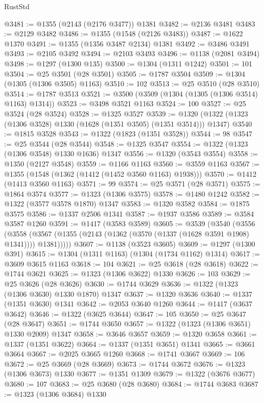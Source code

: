 \begin{lexlean}{RustStd}
\begin{coremodule}
{\begin{coremodule}
{{{{{{{{{{{{{{{{{{{{{{{{{{{{{{{{{{@3481 := @1355 (@2143 (@2176 @3477)) @1381
@3482 := @2136 @3481
@3483 := @2129 @3482
@3486 := @1355 (@1548 (@2126 @3483))
@3487 := @1622 @1370
@3491 := @1355 (@1356 @3487 @2134) @1381
@3492 := @3486 @3491
@3493 := @2105 @3492
@3494 := @2103 @3493
@3496 := @1138 (@2081 @3494)
@3498 := @1297 (@1300 @135)
@3500 := @1304 (@1311 @1242)
@3501 := 101
@3504 := @25 @3501 (@28 @3501)
@3505 := @1787 @3504
@3509 := @1304 (@1305 (@1306 @3505) @1163)
@3510 := 102
@3513 := @25 @3510 (@28 @3510)
@3514 := @1787 @3513
@3521 := @3500 (@3509 (@1304 (@1305 (@1306 @3514) @1163) @1314))
@3523 := @3498 @3521 @1163
@3524 := 100
@3527 := @25 @3524 (@28 @3524)
@3528 := @1325 @3527
@3539 := @1320 (@1322 (@1323 (@1306 @3528) @1330 (@1628 (@1351 @3505) (@1351 @3514))) @1347)
@3540 := @1815 @3528
@3543 := @1322 (@1823 (@1351 @3528))
@3544 := 98
@3547 := @25 @3544 (@28 @3544)
@3548 := @1325 @3547
@3554 := @1322 (@1323 (@1306 @3548) @1330 @1636) @1347
@3556 := @1320 (@3543 @3554)
@3558 := @1350 (@2127 @3548)
@3559 := @1166 @1163
@3560 := @3559 @1163
@3567 := @1355 (@1548 (@1362 (@1412 (@1452 @3560 @1163) @1938)))
@3570 := @1412 (@1413 @3560 @1163)
@3571 := 99
@3574 := @25 @3571 (@28 @3571)
@3575 := @1864 @3574
@3577 := @1323 (@1306 @3575)
@3578 := @1480 @1242
@3582 := @1322 (@3577 @3578 @1870) @1347
@3583 := @1320 @3582
@3584 := @1875 @3575
@3586 := @1337 @2506 @1341
@3587 := @1937 @3586
@3589 := @3584 @3587 @1260
@3591 := @1417 (@3583 @3589)
@3605 := @3539
    (@3540
      (@3556
        (@3558 (@3567 (@1355 (@2143 (@1362 (@3570 (@1337 (@1628 @3591 @1908) @1341)))) @1381)))))
@3607 := @1138 (@3523 @3605)
@3609 := @1297 (@1300 @391)
@3615 := @1304 (@1311 @1163) (@1304 (@1734 @1162) @1314)
@3617 := @3609 @3615 @1163
@3618 := 104
@3621 := @25 @3618 (@28 @3618)
@3622 := @1744 @3621
@3625 := @1323 (@1306 @3622) @1330
@3626 := 103
@3629 := @25 @3626 (@28 @3626)
@3630 := @1744 @3629
@3636 := @1322 (@1323 (@1306 @3630) @1330 @1870) @1347
@3637 := @1320 @3636
@3640 := @1337 (@1351 @3630) @1341
@3642 := @2053 @3640 @1260
@3644 := @1417 (@3637 @3642)
@3646 := @1322 (@3625 @3644)
@3647 := 105
@3650 := @25 @3647 (@28 @3647)
@3651 := @1744 @3650
@3657 := @1322 (@1323 (@1306 @3651) @1330 @2009) @1347
@3658 := @3646 @3657
@3659 := @1320 @3658
@3661 := @1337 (@1351 @3622)
@3664 := @1337 (@1351 @3651) @1341
@3665 := @3661 @3664
@3667 := @2025 @3665 @1260
@3668 := @1741 @3667
@3669 := 106
@3672 := @25 @3669 (@28 @3669)
@3673 := @1744 @3672
@3676 := @1323 (@1306 @3673) @1330
@3677 := @1351 @1309
@3679 := @1322 (@3676 @3677)
@3680 := 107
@3683 := @25 @3680 (@28 @3680)
@3684 := @1744 @3683
@3687 := @1323 (@1306 @3684) @1330
}}}}}}}}}}}}}}}}}}}}}}}}}}}}}}}}}}
\end{coremodule}}
\end{coremodule}
\end{lexlean}
